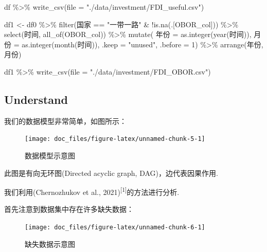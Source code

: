 \documentclass[
]{ctexart}
\newenvironment{Shaded}{\begin{snugshade}}{\end{snugshade}}
\newcommand{\AttributeTok}[1]{\textcolor[rgb]{0.77,0.63,0.00}{#1}}
\newcommand{\DecValTok}[1]{\textcolor[rgb]{0.00,0.00,0.81}{#1}}
\newcommand{\FunctionTok}[1]{\textcolor[rgb]{0.00,0.00,0.00}{#1}}
\newcommand{\NormalTok}[1]{#1}
\newcommand{\OtherTok}[1]{\textcolor[rgb]{0.56,0.35,0.01}{#1}}
\newcommand{\SpecialCharTok}[1]{\textcolor[rgb]{0.00,0.00,0.00}{#1}}
\newcommand{\StringTok}[1]{\textcolor[rgb]{0.31,0.60,0.02}{#1}}
\begin{document}
\begin{Shaded}
\begin{Highlighting}[]
\NormalTok{df }\SpecialCharTok{\%\textgreater{}\%} \FunctionTok{write\_csv}\NormalTok{(}\AttributeTok{file =} \StringTok{"./data/investment/FDI\_useful.csv"}\NormalTok{)}

\NormalTok{df1 }\OtherTok{\textless{}{-}}\NormalTok{ df0 }\SpecialCharTok{\%\textgreater{}\%}
  \FunctionTok{filter}\NormalTok{(国家 }\SpecialCharTok{==} \StringTok{"一带一路"} \SpecialCharTok{\&} \SpecialCharTok{!}\FunctionTok{is.na}\NormalTok{(.[OBOR\_col])) }\SpecialCharTok{\%\textgreater{}\%}
  \FunctionTok{select}\NormalTok{(时间, }\FunctionTok{all\_of}\NormalTok{(OBOR\_col)) }\SpecialCharTok{\%\textgreater{}\%}
  \FunctionTok{mutate}\NormalTok{(}
\NormalTok{    年份 }\OtherTok{=} \FunctionTok{as.integer}\NormalTok{(}\FunctionTok{year}\NormalTok{(时间)),}
\NormalTok{    月份 }\OtherTok{=} \FunctionTok{as.integer}\NormalTok{(}\FunctionTok{month}\NormalTok{(时间)),}
    \AttributeTok{.keep =} \StringTok{"unused"}\NormalTok{, }\AttributeTok{.before =} \DecValTok{1}\NormalTok{) }\SpecialCharTok{\%\textgreater{}\%}
  \FunctionTok{arrange}\NormalTok{(年份, 月份)}

\NormalTok{df1 }\SpecialCharTok{\%\textgreater{}\%} \FunctionTok{write\_csv}\NormalTok{(}\AttributeTok{file =} \StringTok{"./data/investment/FDI\_OBOR.csv"}\NormalTok{)}
\end{Highlighting}
\end{Shaded}

\hypertarget{understand}{%
\subsection{Understand}\label{understand}}

我们的数据模型非常简单，如图所示：

\begin{figure}

{\centering \texttt{[image: doc\_files/figure-latex/unnamed-chunk-5-1]} 

}

\caption{数据模型示意图}\label{fig:unnamed-chunk-5}
\end{figure}

此图是有向无环图(Directed acyclic graph, DAG)，边代表因果作用.

我们利用(Chernozhukov et al.,
2021)\textsuperscript{{[}1{]}}的方法进行分析.

首先注意到数据集中存在许多缺失数据：

\begin{figure}

{\centering \texttt{[image: doc\_files/figure-latex/unnamed-chunk-6-1]} 

}

\caption{缺失数据示意图}\label{fig:unnamed-chunk-6}
\end{figure}
\end{document}
